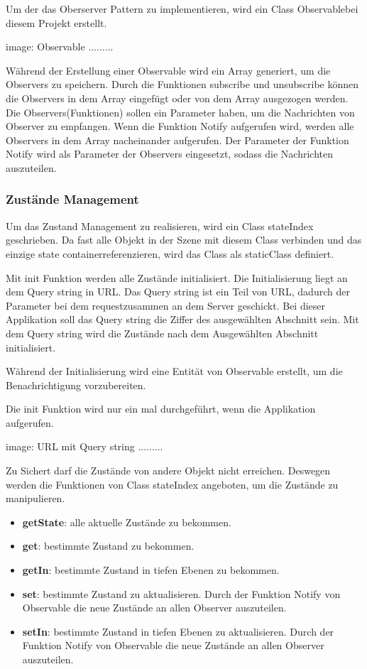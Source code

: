   Um der das Oberserver Pattern zu implementieren, wird ein Class \glqq Observable\grqq bei diesem Projekt erstellt.
  
  image: Observable .........
  
  Während der Erstellung einer Observable wird ein Array generiert, um die Observers zu speichern. Durch die Funktionen subscribe und unsubscribe können die Observers in dem Array eingefügt oder von dem Array ausgezogen werden. Die Observers(Funktionen) sollen ein Parameter haben, um die Nachrichten von Observer zu empfangen. Wenn die Funktion Notify aufgerufen wird, werden alle Observers in dem Array nacheinander aufgerufen. Der Parameter der Funktion Notify wird als Parameter der Observers eingesetzt, sodass die Nachrichten auszuteilen.
  
  
  \subsubsection{Zustände Management}
  
  Um das Zustand Management zu realisieren, wird ein Class stateIndex geschrieben. Da fast alle Objekt in der Szene mit diesem Class verbinden und das einzige \glqq state container\grqq referenzieren, wird das Class als \glqq static\grqq Class definiert.
  
  Mit init Funktion werden alle Zustände initialisiert. Die Initialisierung liegt an dem Query string in URL. Das Query string ist ein Teil von URL, dadurch der  Parameter bei dem \glqq request\grqq zusammen an dem Server geschickt. Bei dieser Applikation soll das Query string die Ziffer des ausgewählten Abschnitt sein. Mit dem Query string wird die Zustände nach dem Ausgewählten Abschnitt initialisiert.
  
  Während der Initialisierung wird eine Entität von Observable erstellt, um die Benachrichtigung vorzubereiten.
  
  Die init Funktion wird nur ein mal durchgeführt, wenn die Applikation aufgerufen.
  
  image: URL mit Query string .........
  
  Zu Sichert darf die Zustände von andere Objekt nicht erreichen. Deswegen werden die Funktionen von Class stateIndex angeboten, um die Zustände zu manipulieren.
  
  \begin{itemize}
      \item \textbf{getState}: alle aktuelle Zustände zu bekommen.
      \item \textbf{get}: bestimmte Zustand zu bekommen.
      \item \textbf{getIn}: bestimmte Zustand in tiefen Ebenen zu bekommen.
      \item \textbf{set}: bestimmte Zustand zu aktualisieren. Durch der Funktion Notify von Observable die neue Zustände an allen Observer auszuteilen.
      \item \textbf{setIn}: bestimmte Zustand in tiefen Ebenen zu aktualisieren. Durch der Funktion Notify von Observable die neue Zustände an allen Observer auszuteilen.
  \end{itemize}
  
